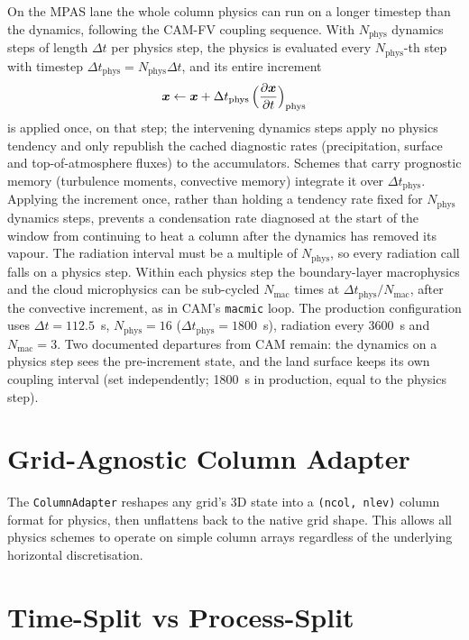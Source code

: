 \documentclass[11pt,twoside]{report}
\newcommand{\pp}{\partial}
\newcommand{\vect}[1]{\bm{#1}}
\begin{document}
On the MPAS lane the whole column physics can run on a longer timestep than
the dynamics, following the CAM-FV coupling sequence.  With
$N_{\mathrm{phys}}$ dynamics steps of length $\Delta t$ per physics step, the
physics is evaluated every $N_{\mathrm{phys}}$-th step with timestep
$\Delta t_{\mathrm{phys}}=N_{\mathrm{phys}}\Delta t$, and its entire
increment
\begin{equation}
  \vect{x} \leftarrow \vect{x} + \Delta t_{\mathrm{phys}}\,
  \Bigl(\frac{\pp\vect{x}}{\pp t}\Bigr)_{\mathrm{phys}}
\end{equation}
is applied once, on that step; the intervening dynamics steps apply no physics
tendency and only republish the cached diagnostic rates (precipitation,
surface and top-of-atmosphere fluxes) to the accumulators.  Schemes that
carry prognostic memory (turbulence moments, convective memory) integrate it
over $\Delta t_{\mathrm{phys}}$.  Applying the increment once, rather than
holding a tendency rate fixed for $N_{\mathrm{phys}}$ dynamics steps, prevents
a condensation rate diagnosed at the start of the window from continuing to
heat a column after the dynamics has removed its vapour.  The radiation
interval must be a multiple of $N_{\mathrm{phys}}$, so every radiation call
falls on a physics step.  Within each physics step the boundary-layer
macrophysics and the cloud microphysics can be sub-cycled
$N_{\mathrm{mac}}$ times at $\Delta t_{\mathrm{phys}}/N_{\mathrm{mac}}$,
after the convective increment, as in CAM's \texttt{macmic} loop.  The
production configuration uses $\Delta t=112.5$~s, $N_{\mathrm{phys}}=16$
($\Delta t_{\mathrm{phys}}=1800$~s), radiation every 3600~s and
$N_{\mathrm{mac}}=3$.  Two documented departures from CAM remain: the
dynamics on a physics step sees the pre-increment state, and the land
surface keeps its own coupling interval (set independently; 1800~s in
production, equal to the physics step).

\section{Grid-Agnostic Column Adapter}

The \texttt{ColumnAdapter} reshapes any grid's 3D state into a
\texttt{(ncol, nlev)} column format for physics, then unflattens back
to the native grid shape.  This allows all physics schemes to operate
on simple column arrays regardless of the underlying horizontal
discretisation.

\section{Time-Split vs Process-Split}
\end{document}

